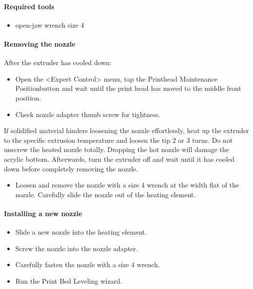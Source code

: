 \paragraph{Required tools}

\begin{itemize}
  \item open-jaw wrench size 4
\end{itemize}

\paragraph{Removing the nozzle}

After the extruder has cooled down:

\begin{itemize}
  \item Open the <Expert Control> menu, tap the \lbrack Printhead Maintenance Position\rbrack  button 
        and wait until the print head has moved to the middle front position.
  \item Check nozzle adapter thumb screw for tightness.
\end{itemize}


\begin{notice}
  If solidified material hinders loosening the nozzle effortlessly, heat up the extruder to the specific extrusion temperature and loosen the tip 2 or 3 turns. Do not unscrew the heated nozzle totally. Dropping the hot nozzle will damage the acrylic bottom. Afterwards, turn the extruder off and wait until it has cooled down before completely removing the nozzle. 
\end{notice}

\begin{itemize}
  \item Loosen and remove the nozzle with a size 4 wrench at the width flat of the nozzle. Carefully slide the nozzle out of
        the heating element.
\end{itemize} 

\paragraph{Installing a new nozzle}

\begin{itemize}
  \item Slide a new nozzle into the heating element.
  \item Screw the nozzle into the nozzle adapter. 
  \item Carefully fasten the nozzle with a size 4 wrench.
  \item Run the Print Bed Leveling wizard. 
\end{itemize} 


